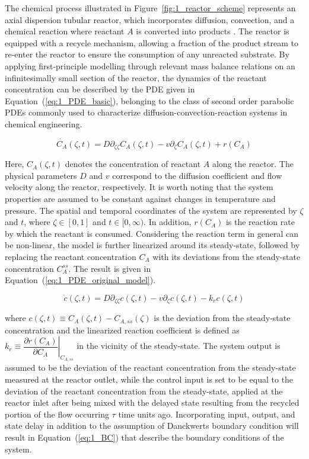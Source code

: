 The chemical process illustrated in Figure~\ref{fig:1_reactor_scheme} represents an axial dispersion tubular reactor, which incorporates diffusion, convection, and a chemical reaction where reactant $A$ is converted into products \autocite{levenspiel1998chemical}. The reactor is equipped with a recycle mechanism, allowing a fraction of the product stream to re-enter the reactor to ensure the consumption of any unreacted substrate. By applying first-principle modelling through relevant mass balance relations on an infinitesimally small section of the reactor, the dynamics of the reactant concentration can be described by the PDE given in Equation~(\ref{eq:1_PDE_basic}), belonging to the class of second order parabolic PDEs commonly used to characterize diffusion-convection-reaction systems \autocite{jensen1982bifurcation} in chemical engineering.

\begin{equation} \label{eq:1_PDE_basic}
    \dot{C_A}(\zeta, t) = D \partial_{\zeta \zeta} C_A(\zeta, t) - v \partial_\zeta C_A(\zeta, t) + r(C_A)
\end{equation}

Here, $C_A(\zeta, t)$ denotes the concentration of reactant $A$ along the reactor. The physical parameters $D$ and $v$ correspond to the diffusion coefficient and flow velocity along the reactor, respectively. It is worth noting that the system properties are assumed to be constant against changes in temperature and pressure. The spatial and temporal coordinates of the system are represented by $\zeta$ and $t$, where $\zeta \in [0, 1]$ and $t \in [0, \infty)$. In addition, $r(C_A)$ is the reaction rate by which the reactant is consumed. Considering the reaction term in general can be non-linear, the model is further linearized around its steady-state, followed by replacing the reactant concentration $C_A$ with its deviations from the steady-state concentration $C_{A}^{ss}$. The result is given in Equation~(\ref{eq:1_PDE_original_model}).

\begin{equation} \label{eq:1_PDE_original_model}
    \dot{c}(\zeta, t) = D \partial_{\zeta \zeta} c(\zeta, t) - v \partial_\zeta c(\zeta, t) - k_r c(\zeta, t)
\end{equation}

where $c(\zeta, t) \equiv C_A(\zeta, t) - C_{A, ss}(\zeta)$ is the deviation from the steady-state concentration and the linearized reaction coefficient is defined as $k_r \equiv \left. \dfrac{\partial r(C_A)}{\partial C_A} \right|_{C_{A, ss}}$ in the vicinity of the steady-state. The system output is assumed to be the deviation of the reactant concentration from the steady-state measured at the reactor outlet, while the control input is set to be equal to the deviation of the reactant concentration from the steady-state, applied at the reactor inlet after being mixed with the delayed state resulting from the recycled portion of the flow occurring $\tau$ time units ago. Incorporating input, output, and state delay in addition to the assumption of Danckwerts boundary condition will result in Equation~(\ref{eq:1_BC}) that describe the boundary conditions of the system.

